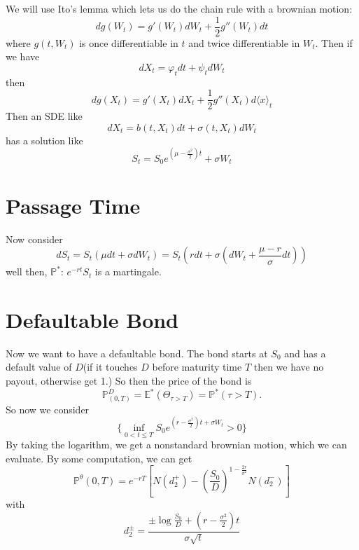 We will use Ito's lemma which lets us do the chain rule with a brownian motion:
\begin{equation}
	dg(W_t) = g'(W_t) dW_t + \frac12 g''(W_t)dt
\end{equation}
where $g(t,W_t)$ is once differentiable in $t$ and twice differentiable in $W_t$. Then if we have
\begin{equation}
	dX_t = \varphi_t dt + \psi_t dW_t
\end{equation}
then
\begin{equation}
	dg(X_t)  = g'(X_t)dX_t + \frac{1}{2} g''(X_t)d\langle x\rangle_t
\end{equation}
Then an SDE like
\begin{equation}
	dX_t = b(t,X_t)dt + \sigma(t,X_t) dW_t
\end{equation}
has a solution like
\begin{equation}
	S_t = S_0 e^{(\mu - \frac{\sigma^2}{2})t} + \sigma W_t
\end{equation}

\section{Passage Time}
Now consider
\begin{equation}
	dS_t = S_t(\mu dt + \sigma dW_t) = S_t(r dt + \sigma(dW_t + \frac{\mu-r}{\sigma}dt))
\end{equation}
well then, $\mathbb{P}^*$: $e^{-rt}S_t$ is a martingale.

\section{Defaultable Bond}
Now we want to have a defaultable bond. The bond starts at $S_0$ and has a default value of $D$(if it touches $D$ before maturity time $T$ then we have no payout, otherwise get 1.) So then the price of the bond is
\begin{equation}
	\mathbb{P}^D_{(0,T)} = \mathbb{E}^*(\Theta_{\tau > T}) = \mathbb{P}^*(\tau > T).
\end{equation}
So now we consider
\begin{equation}
	\{ \inf_{0 < t \leq T} S_0 e^{(r- \frac{\sigma^2}{2})t + \sigma W_t} > 0 \} 
\end{equation}
By taking the logarithm, we get a nonstandard brownian motion, which we can evaluate. By some computation, we can get
\begin{equation}
	\mathbb{P}^\theta(0,T) = e^{-rT}\left[ N(d_2^+) - \left(\frac{S_0}{D} \right)^{1-\frac{2r}{\sigma^2}}N(d_2^-) \right]
\end{equation}
with
\begin{equation}
	d_2^{\pm} = \frac{\pm \log \frac{S_0}{D} + \left(r - \frac{\sigma^2}{2} \right)t}{\sigma \sqrt{t}}
\end{equation}

